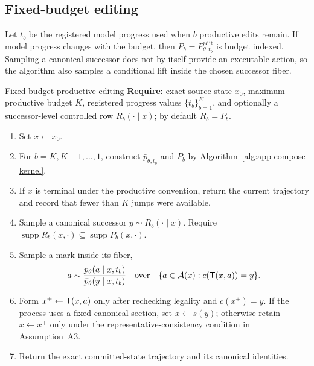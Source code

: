 \subsection{Fixed-budget editing}
\label{sec:app-compose-fixed-budget}

Let $t_b$ be the registered model progress used when $b$ productive edits
remain.  If model progress changes with the budget, then
$P_b=P_{\theta,t_b}^{\mathrm{edit}}$ is budget indexed.  Sampling a canonical
successor does not by itself provide an executable action, so the algorithm
also samples a conditional lift inside the chosen successor fiber.

\begin{composeappendixalgorithm}{Fixed-budget productive editing}
\label{alg:app-compose-fixed-budget}
\textbf{Require:} exact source state $x_0$, maximum productive budget $K$,
registered progress values $\{t_b\}_{b=1}^K$, and optionally a
successor-level controlled row $R_b(\cdot\mid x)$; by default $R_b=P_b$.
\begin{enumerate}[
  leftmargin=2.45em,
  label=\arabic*:,
  topsep=0.25em,
  itemsep=0.12em,
  parsep=0pt
]
  \item Set $x\leftarrow x_0$.
  \item For $b=K,K-1,\ldots,1$, construct
  $\bar p_{\theta,t_b}$ and $P_b$ by
  Algorithm~\ref{alg:app-compose-kernel}.
  \item If $x$ is terminal under the productive convention, return the
  current trajectory and record that fewer than $K$ jumps were available.
  \item Sample a canonical successor $y\sim R_b(\cdot\mid x)$.
  Require $\operatorname{supp}R_b(x,\cdot)
  \subseteq\operatorname{supp}P_b(x,\cdot)$.
  \item Sample a mark inside its fiber,
  \[
    a\sim
    \frac{p_\theta(a\mid x,t_b)}
         {\bar p_\theta(y\mid x,t_b)}
    \quad\text{over}\quad
    \{a\in\mathcal{A}(x):c(\mathsf{T}(x,a))=y\}.
  \]
  \item Form $x^+\leftarrow\mathsf{T}(x,a)$ only after rechecking legality and
  $c(x^+)=y$.  If the process uses a fixed canonical section, set
  $x\leftarrow s(y)$; otherwise retain $x\leftarrow x^+$ only under the
  representative-consistency condition in Assumption~A3.
  \item Return the exact committed-state trajectory and its canonical
  identities.
\end{enumerate}
\end{composeappendixalgorithm}

